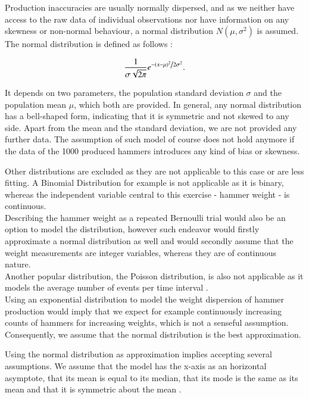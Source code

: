 Production inaccuracies are usually normally dispersed, and as we neither have access to the raw data of individual observations nor have information on any skewness or non-normal behaviour, a normal distribution $N(\mu, \sigma^2)$ is assumed.
The normal distribution is defined as follows \cite[Definition~3.4.1]{hogg}: 

\begin{equation} \frac{1}{{\sigma \sqrt {2\pi } }}e^{{{ - \left( {x - \mu } \right)^2 } \mathord{\left/ {\vphantom {{ - \left( {x - \mu } \right)^2 } {2\sigma ^2 }}} \right. \kern-\nulldelimiterspace}{2\sigma ^2 }}}.
\label{eq:normaldist}
\end{equation}


It depends on two parameters, the population standard deviation $\sigma$ and the population mean $\mu$, which both are provided. In general, any normal distribution has a bell-shaped form, indicating that it is symmetric and not skewed to any side. Apart from the mean and the standard deviation, we are not provided any further data.  The assumption of such model of course does not hold anymore if the data of the 1000 produced hammers introduces any kind of bias or skewness. 


Other distributions are excluded as they are not applicable to this case or are less fitting. A Binomial Distribution for example is not applicable as it is binary, whereas the independent variable central to this exercise - hammer weight - is continuous. \\Describing the hammer weight as a repeated Bernoulli trial would also be an option to model the distribution, however such endeavor would firstly approximate a normal distribution as well and would secondly assume that the weight measurements are integer variables, whereas they are of continuous nature. \\
Another popular distribution, the Poisson distribution, is also not applicable as it models the average number of events per time interval \cite{bruce2017practical}. \\
Using an exponential distribution to model the weight dispersion of hammer production would imply that we expect for example continuously increasing counts of hammers for increasing weights, which is not a senseful assumption. \\
Consequently, we assume that the normal distribution is the best approximation.

Using the normal distribution as approximation implies accepting several assumptions. We assume that the model has the x-axis as an horizontal asymptote, that its mean is equal to its median, that its mode is the same as its mean and that it is symmetric about the mean \cite[Chapter~3.4]{hogg}.

